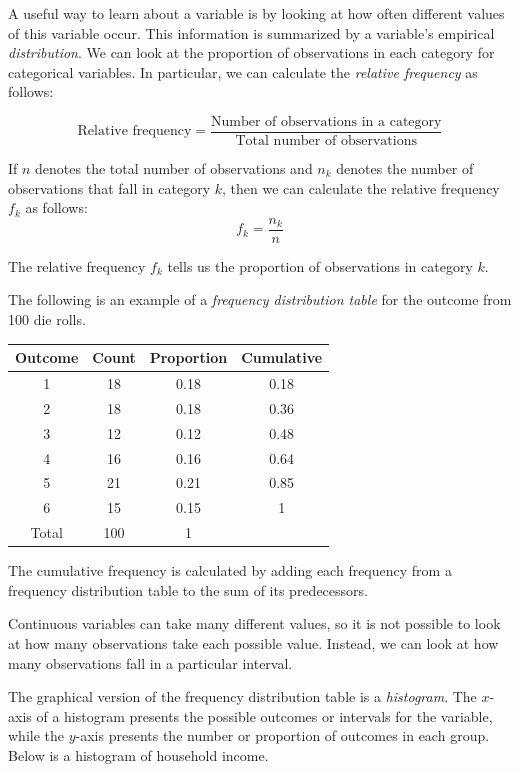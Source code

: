 \documentclass{./../../Latex/handout}
\begin{document}
A useful way to learn about a variable is by looking at how often different values of this variable occur. This information is summarized by a variable's empirical \textit{distribution}. We can look at the proportion of observations in each category for categorical variables. In particular, we can calculate the \textit{relative frequency} as follows:

$$ \text{Relative frequency} =  \frac{\text{Number of observations in a category}}{\text{Total number of observations}} $$ 

 If $n$ denotes the total number of observations and $n_k$ denotes the number of observations that fall in category $k$, then we can calculate the relative frequency $f_k$ as follows:
$$ f_k = \frac{n_k}{n} $$

The relative frequency $f_k$ tells us the proportion of observations in category $k$. 

The following is an example of a \textit{frequency distribution table} for the outcome from 100 die rolls. 

\begin{center}
\begin{tabular}{cccc}
\toprule
Outcome & Count & Proportion & Cumulative \\
\midrule
1 &  18 & 0.18 & 0.18 \\
2 & 18 & 0.18 & 0.36 \\
3 & 12 & 0.12 & 0.48 \\
4 & 16 & 0.16 & 0.64 \\
5 & 21 & 0.21 & 0.85 \\
6 & 15 & 0.15 & 1 \\
\hline
Total & 100 & 1 & \\
\bottomrule
\end{tabular} 
\end{center}

The cumulative frequency is calculated by adding each frequency from a frequency distribution table to the sum of its predecessors. 

Continuous variables can take many different values, so it is not possible to look at how many observations take each possible value. Instead, we can look at how many observations fall in a particular interval. 

The graphical version of the frequency distribution table is a \textit{histogram}. The $x$-axis of a histogram presents the possible outcomes or intervals for the variable, while the $y$-axis presents the number or proportion of outcomes in each group. Below is a histogram of household income. 
\end{document}
